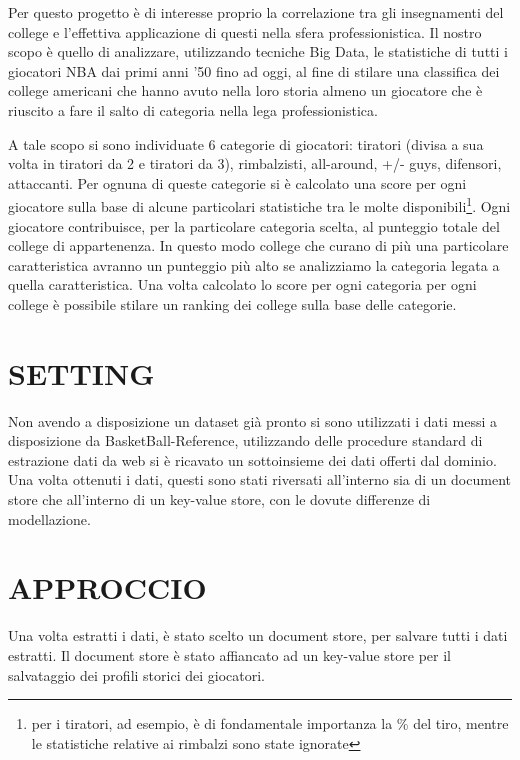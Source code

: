 \documentclass[10pt,a4paper,twocolumn]{article}
\begin{document}
Per questo progetto è di interesse proprio la correlazione tra gli insegnamenti del college e l'effettiva applicazione di questi nella sfera professionistica. Il nostro scopo è quello di analizzare, utilizzando tecniche Big Data, le statistiche di tutti i giocatori NBA dai primi anni '50 fino ad oggi, al fine di stilare una classifica dei college americani che hanno avuto nella loro storia almeno un giocatore che è riuscito a fare il salto di categoria nella lega professionistica.

A tale scopo si sono individuate 6 categorie di giocatori: tiratori (divisa a sua volta in tiratori da 2 e tiratori da 3), rimbalzisti, all-around, +/- guys, difensori, attaccanti. Per ognuna di queste categorie si è calcolato una score per ogni giocatore sulla base di alcune particolari statistiche tra le molte disponibili\footnote{per i tiratori, ad esempio, è di fondamentale importanza la \% del tiro, mentre le statistiche relative ai rimbalzi sono state ignorate}. Ogni giocatore contribuisce, per la particolare categoria scelta, al punteggio totale del college di appartenenza. In questo modo college che curano di più una particolare caratteristica avranno un punteggio più alto se analizziamo la categoria legata a quella caratteristica. Una volta calcolato lo score per ogni categoria per ogni college è possibile stilare un ranking dei college sulla base delle categorie.


\section{SETTING}

Non avendo a disposizione un dataset già pronto si sono utilizzati i dati messi a disposizione da BasketBall-Reference, utilizzando delle procedure standard di estrazione dati da web si è ricavato un sottoinsieme dei dati offerti dal dominio. Una volta ottenuti i dati, questi sono stati riversati all'interno sia di un document store che all'interno di un key-value store, con le dovute differenze di modellazione.

\section{APPROCCIO}

Una volta estratti i dati, è stato scelto un document store, per salvare tutti i dati estratti. Il document store è stato affiancato ad un key-value store per il salvataggio dei profili storici dei giocatori.
\end{document}
